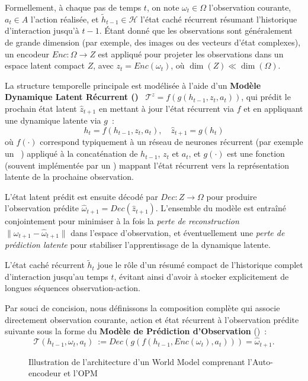 Formellement, à chaque pas de temps $t$, on note $\omega_t \in \Omega$ l'observation courante, $a_t \in A$ l'action réalisée, et $\tilde{h}_{t-1} \in \mathcal{H}$ l'état caché récurrent résumant l'historique d'interaction jusqu'à $t-1$. Étant donné que les observations sont généralement de grande dimension (par exemple, des images ou des vecteurs d'état complexes), un encodeur $Enc: \Omega \rightarrow Z$ est appliqué pour projeter les observations dans un espace latent compact $Z$, avec $z_t = Enc(\omega_t)$, où $\dim(Z) \ll \dim(\Omega)$.

La structure temporelle principale est modélisée à l'aide d'un \textbf{Modèle Dynamique Latent Récurrent ()}~\cite{hafner2020dream} $\mathcal{T}^{z} = f(g(h_{t-1}, z_t, a_t))$, qui prédit le prochain état latent $\hat{z}_{t+1}$ en mettant à jour l'état récurrent via $f$ et en appliquant une dynamique latente via $g$~:
\[
  h_t = f(h_{t-1}, z_t, a_t), \quad \hat{z}_{t+1} = g(h_t)
\]
où $f(\cdot)$ correspond typiquement à un réseau de neurones récurrent (par exemple un ~\cite{hochreiter1997long}) appliqué à la concaténation de $h_{t-1}$, $z_t$ et $a_t$, et $g(\cdot)$ est une fonction (souvent implémentée par un ) mappant l'état récurrent vers la représentation latente de la prochaine observation.

L'état latent prédit est ensuite décodé par $Dec: Z \rightarrow \Omega$ pour produire l'observation prédite $\hat{\omega}_{t+1} = Dec(\hat{z}_{t+1})$. L'ensemble du modèle est entraîné conjointement pour minimiser à la fois la \emph{perte de reconstruction} $\|\omega_{t+1} - \hat{\omega}_{t+1}\|$ dans l'espace d'observation, et éventuellement une \emph{perte de prédiction latente} pour stabiliser l'apprentissage de la dynamique latente.

L'état caché récurrent $\tilde{h}_t$ joue le rôle d'un résumé compact de l'historique complet d'interaction jusqu'au temps $t$, évitant ainsi d'avoir à stocker explicitement de longues séquences observation-action.

Par souci de concision, nous définissons la composition complète qui associe directement observation courante, action et état récurrent à l'observation prédite suivante sous la forme du \textbf{Modèle de Prédiction d'Observation} ()~:
\[
  \mathcal{T}(h_{t-1}, \omega_t, a_t)~:= Dec(g(f(h_{t-1}, Enc(\omega_t), a_t))) = \hat{\omega}_{t+1}.
\]

\begin{figure}[h!]
  \centering
  \resizebox{\textwidth}{!}{%
    
  }
  \caption{Illustration de l'architecture d'un World Model comprenant l'Auto-encodeur et l'OPM}
  \label{fig:single_agent_world_model}
\end{figure}

